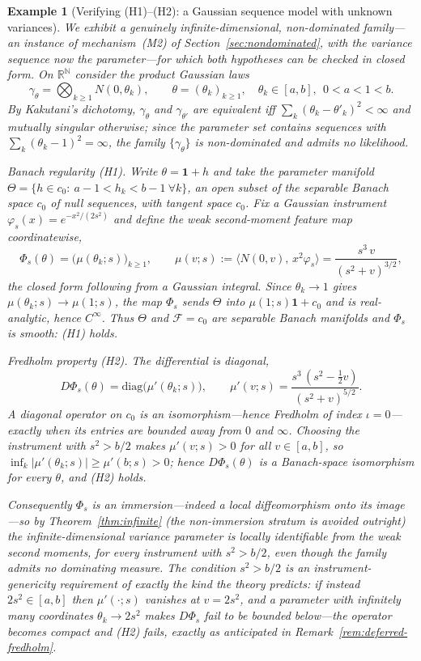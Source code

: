 \documentclass[11pt,a4paper]{article}
\newtheorem{example}[theorem]{Example}
\newcommand{\R}{\mathbb{R}}
\begin{document}
\begin{example}[Verifying \textnormal{(H1)--(H2)}: a Gaussian sequence model
with unknown variances]
\label{ex:gaussian-sequence}
We exhibit a genuinely infinite-dimensional, non-dominated family---an instance
of mechanism~(M2) of Section~\ref{sec:nondominated}, with the variance sequence
now the parameter---for which both hypotheses can be checked in closed form.  On
$\R^{\mathbb N}$ consider the product Gaussian laws
\[
  \gamma_\theta = \bigotimes_{k\ge 1} N(0,\theta_k),
  \qquad
  \theta=(\theta_k)_{k\ge1},\quad \theta_k\in[a,b],\ \ 0<a<1<b .
\]
By Kakutani's dichotomy, $\gamma_\theta$ and $\gamma_{\theta'}$ are equivalent
iff $\sum_k(\theta_k-\theta'_k)^2<\infty$ and mutually singular otherwise; since
the parameter set contains sequences with $\sum_k(\theta_k-1)^2=\infty$, the
family $\{\gamma_\theta\}$ is non-dominated and admits no likelihood.

\smallskip
\noindent\emph{Banach regularity \textnormal{(H1)}.}  Write
$\theta=\mathbf 1+h$ and take the parameter manifold
$\Theta=\{h\in c_0:\ a-1<h_k<b-1\ \forall k\}$, an open subset of the separable
Banach space $c_0$ of null sequences, with tangent space $c_0$.  Fix a Gaussian
instrument $\varphi_s(x)=e^{-x^2/(2s^2)}$ and define the weak second-moment
feature map coordinatewise,
\[
  \Phi_s(\theta)=\bigl(\mu(\theta_k;s)\bigr)_{k\ge1},
  \qquad
  \mu(v;s):=\langle N(0,v),\,x^2\varphi_s\rangle
  =\frac{s^3\,v}{(s^2+v)^{3/2}},
\]
the closed form following from a Gaussian integral.  Since $\theta_k\to1$ gives
$\mu(\theta_k;s)\to\mu(1;s)$, the map $\Phi_s$ sends $\Theta$ into
$\mu(1;s)\mathbf 1+c_0$ and is real-analytic, hence $C^\infty$.  Thus $\Theta$
and $\mathcal F=c_0$ are separable Banach manifolds and $\Phi_s$ is smooth:
\textnormal{(H1)} holds.

\smallskip
\noindent\emph{Fredholm property \textnormal{(H2)}.}  The differential is
diagonal,
\[
  D\Phi_s(\theta)=\mathrm{diag}\bigl(\mu'(\theta_k;s)\bigr),
  \qquad
  \mu'(v;s)=\frac{s^3\,(s^2-\tfrac12 v)}{(s^2+v)^{5/2}} .
\]
A diagonal operator on $c_0$ is an isomorphism---hence Fredholm of index
$\iota=0$---exactly when its entries are bounded away from $0$ and $\infty$.
Choosing the instrument with $s^2>b/2$ makes $\mu'(v;s)>0$ for all $v\in[a,b]$,
so $\inf_k|\mu'(\theta_k;s)|\ge\mu'(b;s)>0$; hence $D\Phi_s(\theta)$ is a
Banach-space isomorphism for every $\theta$, and \textnormal{(H2)} holds.

Consequently $\Phi_s$ is an immersion---indeed a local diffeomorphism onto its
image---so by Theorem~\ref{thm:infinite} (the non-immersion stratum is avoided
outright) the infinite-dimensional variance parameter is \emph{locally
identifiable} from the weak second moments, for every instrument with
$s^2>b/2$, even though the family admits no dominating measure.  The condition
$s^2>b/2$ is an instrument-genericity requirement of exactly the kind the theory
predicts: if instead $2s^2\in[a,b]$ then $\mu'(\cdot;s)$ vanishes at $v=2s^2$,
and a parameter with infinitely many coordinates $\theta_k\to 2s^2$ makes
$D\Phi_s$ fail to be bounded below---the operator becomes compact and
\textnormal{(H2)} fails, exactly as anticipated in
Remark~\ref{rem:deferred-fredholm}.
\end{example}
\end{document}
